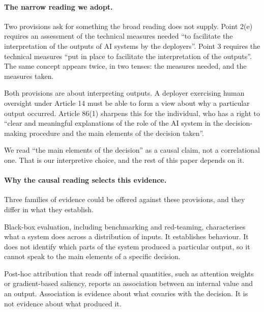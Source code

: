 \documentclass[letterpaper]{article} %
\begin{document}
\paragraph{The narrow reading we adopt.}
Two provisions ask for something the broad reading does not supply. Point 2(e)
requires an assessment of the technical measures needed ``to facilitate the
interpretation of the outputs of AI systems by the deployers''. Point 3 requires
the technical measures ``put in place to facilitate the interpretation of the
outputs''. The same concept appears twice, in two tenses: the measures needed,
and the measures taken.

Both provisions are about interpreting outputs. A deployer exercising human
oversight under Article 14 must be able to form a view about why a particular
output occurred. Article 86(1) sharpens this for the individual, who has a right
to ``clear and meaningful explanations of the role of the AI system in the
decision-making procedure and the main elements of the decision taken''.

We read ``the main elements of the decision'' as a causal claim, not a
correlational one. That is our interpretive choice, and the rest of this paper
depends on it.

\paragraph{Why the causal reading selects this evidence.}
Three families of evidence could be offered against these provisions, and they
differ in what they establish.

Black-box evaluation, including benchmarking and red-teaming, characterises what
a system does across a distribution of inputs. It establishes behaviour. It does
not identify which parts of the system produced a particular output, so it cannot
speak to the main elements of a specific decision.

Post-hoc attribution that reads off internal quantities, such as attention
weights or gradient-based saliency, reports an association between an internal
value and an output. Association is evidence about what covaries with the
decision. It is not evidence about what produced it.
\end{document}
